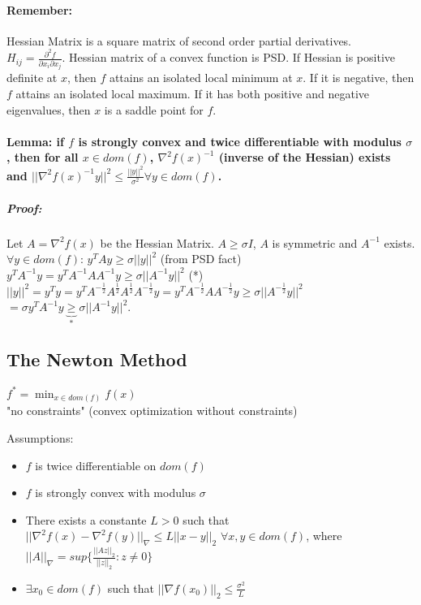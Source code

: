 \documentclass[main]{subfiles}
\begin{document}
\paragraph{Remember:}
Hessian Matrix is a square matrix of second order partial derivatives.\\
$H_{ij} = \frac{\partial^2 f}{\partial x_i \partial x_j}$.
Hessian matrix of a convex function is PSD. If Hessian is positive definite at
$x$, then $f$ attains an isolated local minimum at $x$. If it is negative, then
$f$ attains an isolated local maximum. If it has both positive and negative
eigenvalues, then $x$ is a saddle point for $f$.

\paragraph{Lemma: if $f$ is strongly convex and twice differentiable with
modulus $\sigma$, then for all $x \in dom(f)$,
$\nabla^2 f(x)^{-1}$ (inverse of the Hessian) exists and
$||\nabla^2 f(x)^{-1} y||^2 \leq \frac{||y||^2}{ \sigma^2}
\forall y \in dom(f)$.}

\subparagraph{Proof:}
Let $A = \nabla^2 f(x)$ be the Hessian Matrix. $A \geq \sigma I$, $A$ is
symmetric and $A^{-1}$ exists.\\
$\forall y \in dom(f)$: $y^T Ay \geq \sigma ||y||^2$ (from PSD fact)\\
$y^T A^{-1}y = y^T A^{-1}A A^{-1}y \geq \sigma ||A^{-1}y||^2$ (*)\\
$||y||^2 = y^Ty = y^T A^{-\frac{1}{2}}A^{\frac{1}{2}}A^{\frac{1}{2}}
A^{-\frac{1}{2}} y = y^T A^{-\frac{1}{2}} A A^{-\frac{1}{2}}y \geq
\sigma ||A^{-\frac{1}{2}}y||^2$\\
$= \sigma y^T A^{-1}y \underbrace{\geq}_{*} \sigma ||A^{-1}y||^2$.

\subsection{The Newton Method}

$f^* = \displaystyle \min_{x \in dom(f)} f(x)$\\
"no constraints" (convex optimization without constraints)

Assumptions:
\begin{itemize}
\item $f$ is twice differentiable on $dom(f)$
\item $f$ is strongly convex with modulus $\sigma$
\item There exists a constante $L > 0$ such that $||\nabla^2 f(x)
- \nabla^2f(y)||_\nabla \leq L ||x-y||_2$ $\forall x, y \in dom(f)$,
where $||A||_\nabla = sup\{\frac{||Az||_2}{||z||_2}: z \neq 0 \}$
\item $\exists x_0 \in dom(f)$ such that $||\nabla f(x_0)||_2 \leq
\frac{\sigma^2}{L}$
\end{itemize}
\end{document}
